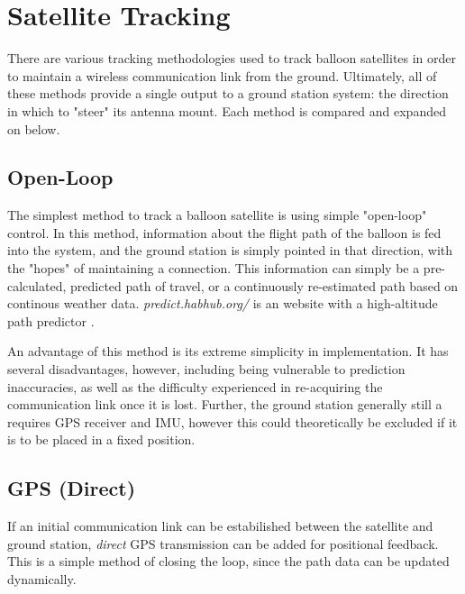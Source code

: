 \graphicspath{{./figures/}}

\section{Satellite Tracking}
There are various tracking methodologies used to track balloon satellites in order to maintain a wireless communication link from the ground. Ultimately, all of these methods provide a single output to a ground station system: the direction in which to "steer" its antenna mount. Each method is compared and expanded on below.

\subsection{Open-Loop}
The simplest method to track a balloon satellite is using simple "open-loop" control. In this method, information about the flight path of the balloon is fed into the system, and the ground station is simply pointed in that direction, with the "hopes" of maintaining a connection. This information can simply be a pre-calculated, predicted path of travel, or a continuously re-estimated path based on continous weather data. \textit{predict.habhub.org/} is an website with a high-altitude path predictor \cite{site-stratoballooningPredictionTracking}.

An advantage of this method is its extreme simplicity in implementation. It has several disadvantages, however, including being vulnerable to prediction inaccuracies, as well as the difficulty experienced in re-acquiring the communication link once it is lost. Further, the ground station generally still a requires GPS receiver and IMU, however this could theoretically be excluded if it is to be placed in a fixed position.

\subsection{GPS (Direct)}
If an initial communication link can be estabilished between the satellite and ground station, \textit{direct} GPS transmission can be added for positional feedback. This is a simple method of closing the loop, since the path data can be updated dynamically.

